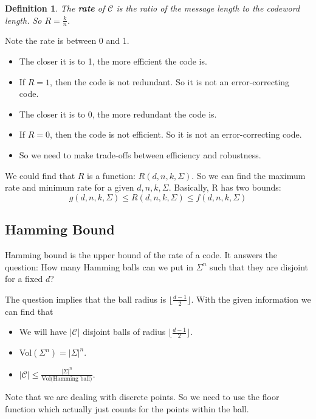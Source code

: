 \documentclass[letterpaper,12pt]{article}
\newtheorem{definition}{Definition}
\begin{document}
\begin{definition}
    The \textbf{rate} of $\mathcal{C}$ is the ratio of the message length to the codeword length. So $R=\frac{k}{n}$.
\end{definition}
Note the rate is between 0 and 1. \begin{itemize}
    \item The closer it is to 1, the more efficient the code is.
    \item If $R=1$, then the code is not redundant. So it is not an error-correcting
          code.
    \item  The closer it is to 0, the more redundant the code is.
    \item If $R=0$, then the code is not efficient. So it is not an error-correcting
          code.
    \item So we need to make trade-offs between efficiency and robustness.
\end{itemize}

We could find that $R$ is a function: $R(d,n,k,\Sigma)$. So we can find the
maximum rate and minimum rate for a given $d,n,k,\Sigma$. Basically, R has two
bounds:
\[g(d,n,k,\Sigma)\le R(d,n,k,\Sigma) \le f(d,n,k,\Sigma)\]
\subsection{Hamming Bound}
Hamming bound is the upper bound of the rate of a code. It answers the
question: How many Hamming balls can we put in $\Sigma^n$ such that they are
disjoint for a fixed $d$?

The question implies that the ball radius is $\lfloor \frac{d-1}{2}\rfloor$.
With the given information we can find that \begin{itemize}
    \item We will have $|\mathcal{C}|$ disjoint balls of radius $\lfloor
              \frac{d-1}{2}\rfloor$.
    \item Vol$(\Sigma^n)=|\Sigma|^n$.
    \item $|\mathcal{C}|\le \frac{|\Sigma|^n}{\text{Vol(Hamming ball)}}$.
\end{itemize}
Note that we are dealing with discrete points. So we need to use the floor function which actually just counts for the points within the ball.
\end{document}
